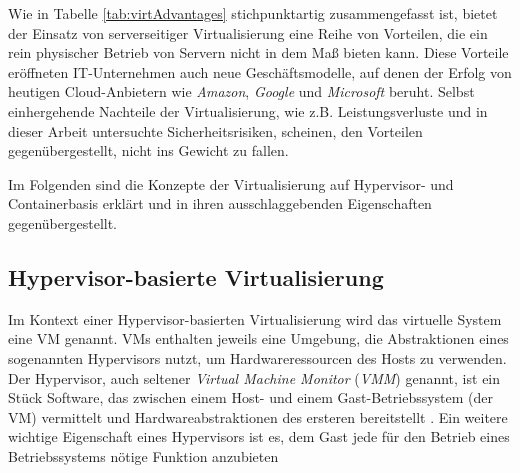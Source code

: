\documentclass[../main.tex]{subfiles}
\begin{document}
		Wie in Tabelle \ref{tab:virtAdvantages} stichpunktartig zusammengefasst ist, bietet der Einsatz von serverseitiger Virtualisierung eine Reihe von Vorteilen, die ein rein physischer Betrieb von Servern nicht in dem Maß bieten kann. Diese Vorteile eröffneten IT-Unternehmen auch neue Geschäftsmodelle, auf denen der Erfolg von heutigen Cloud-Anbietern wie \emph{Amazon}, \emph{Google} und \emph{Microsoft} beruht. Selbst einhergehende Nachteile der Virtualisierung, wie z.B. Leistungsverluste und in dieser Arbeit untersuchte Sicherheitsrisiken, scheinen, den Vorteilen gegenübergestellt, nicht ins Gewicht zu fallen.

		Im Folgenden sind die Konzepte der Virtualisierung auf Hypervisor- und Containerbasis erklärt und in ihren ausschlaggebenden Eigenschaften gegenübergestellt.



    \subsection{Hypervisor-basierte Virtualisierung}
    \label{introVirtHypervisor}
      Im Kontext einer Hypervisor-basierten Virtualisierung wird das virtuelle System eine \acrshort{VM} genannt. \acrshort{VM}s enthalten jeweils eine Umgebung, die Abstraktionen eines sogenannten Hypervisors nutzt, um Hardwareressourcen des Hosts zu verwenden. Der Hypervisor, auch seltener \emph{Virtual Machine Monitor} (\emph{VMM}) genannt, ist ein Stück Software, das zwischen einem Host- und einem Gast-Betriebssystem (der \acrshort{VM}) vermittelt und Hardwareabstraktionen des ersteren bereitstellt \cite[S.6]{dockerBook}\cite[S.2]{containerVirtPerformance}\cite[S.2]{dockerSec1}. Ein weitere wichtige Eigenschaft eines Hypervisors ist es, dem Gast jede für den Betrieb eines Betriebssystems nötige Funktion anzubieten \cite[S.106]{tanenbaumOS}

\end{document}

